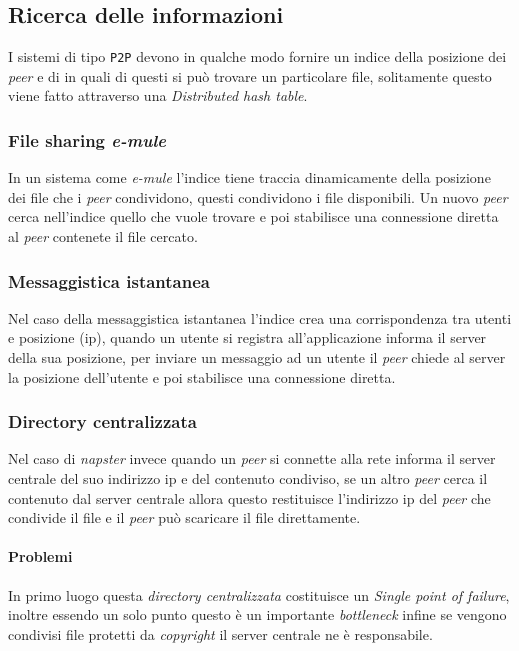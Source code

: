     \subsection{Ricerca delle informazioni}
        I sistemi di tipo \texttt{P2P} devono in qualche modo fornire un indice della posizione dei \textit{peer} e di in quali di questi si può trovare un particolare file, solitamente questo viene fatto attraverso una \textit{Distributed hash table}.
            \subsubsection{File sharing \textit{e-mule}}
                In un sistema come \textit{e-mule} l'indice tiene traccia dinamicamente della posizione dei file che i \textit{peer} condividono, questi condividono i file disponibili. Un nuovo \textit{peer} cerca nell'indice quello che vuole trovare e poi stabilisce una connessione diretta al \textit{peer} contenete il file cercato.
            \subsubsection{Messaggistica istantanea}
                Nel caso della messaggistica istantanea l'indice crea una corrispondenza tra utenti e posizione (ip), quando un utente si registra all'applicazione informa il server della sua posizione, per inviare un messaggio ad un utente il \textit{peer} chiede al server la posizione dell'utente e poi stabilisce una connessione diretta.
            \subsubsection{Directory centralizzata}
                Nel caso di \textit{napster} invece quando un \textit{peer} si connette alla rete informa il server centrale del suo indirizzo ip e del contenuto condiviso, se un altro \textit{peer} cerca il contenuto dal server centrale allora questo restituisce l'indirizzo ip del \textit{peer} che condivide il file e il \textit{peer} può scaricare il file direttamente.
                \paragraph{Problemi} In primo luogo questa \textit{directory centralizzata} costituisce un \textit{Single point of failure}, inoltre essendo un solo punto questo è un importante \textit{bottleneck} infine se vengono condivisi file protetti da \textit{copyright} il server centrale ne è responsabile.
